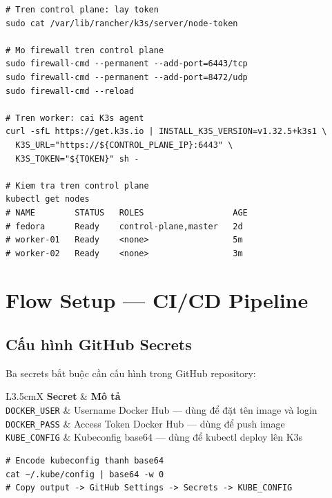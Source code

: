 \begin{lstlisting}[style=bashstyle, caption=Join worker node vào K3s cluster]
# Tren control plane: lay token
sudo cat /var/lib/rancher/k3s/server/node-token

# Mo firewall tren control plane
sudo firewall-cmd --permanent --add-port=6443/tcp
sudo firewall-cmd --permanent --add-port=8472/udp
sudo firewall-cmd --reload

# Tren worker: cai K3s agent
curl -sfL https://get.k3s.io | INSTALL_K3S_VERSION=v1.32.5+k3s1 \
  K3S_URL="https://${CONTROL_PLANE_IP}:6443" \
  K3S_TOKEN="${TOKEN}" sh -

# Kiem tra tren control plane
kubectl get nodes
# NAME        STATUS   ROLES                  AGE
# fedora      Ready    control-plane,master   2d
# worker-01   Ready    <none>                 5m
# worker-02   Ready    <none>                 3m
\end{lstlisting}

\section{Flow Setup — CI/CD Pipeline}

\subsection{Cấu hình GitHub Secrets}

Ba secrets bắt buộc cần cấu hình trong GitHub repository:

\begin{table}[H]
	\centering
	\caption{GitHub Secrets}
	\begin{tabularx}{\textwidth}{L{3.5cm}X}
		\toprule
		\textbf{Secret}       & \textbf{Mô tả}                                       \\
		\midrule
		\texttt{DOCKER\_USER} & Username Docker Hub — dùng để đặt tên image và login \\
		\texttt{DOCKER\_PASS} & Access Token Docker Hub — dùng để push image         \\
		\texttt{KUBE\_CONFIG} & Kubeconfig base64 — dùng để kubectl deploy lên K3s   \\
		\bottomrule
	\end{tabularx}
\end{table}

\begin{lstlisting}[style=bashstyle, caption=Lấy KUBE\_CONFIG cho K3s]
# Encode kubeconfig thanh base64
cat ~/.kube/config | base64 -w 0
# Copy output -> GitHub Settings -> Secrets -> KUBE_CONFIG
\end{lstlisting}

